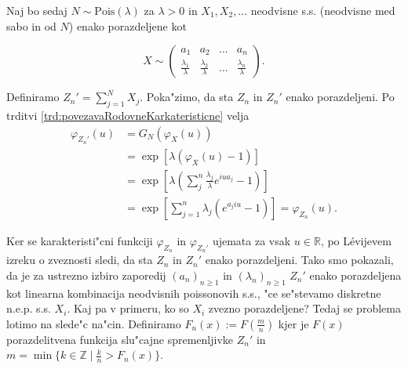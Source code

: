 \documentclass[12pt, a4paper, reqno]{amsart}
\theoremstyle{definition} %
\theoremstyle{plain} %
\newcommand{\R}{\mathbb{R}}
\newcommand{\1}{\mathds{1}}
\newcommand{\Pois}[1]{\text{Pois}(#1)}
\begin{document}
    \noindent
    Naj bo sedaj $N\sim \Pois{\lambda}$  za $\lambda >0$ in $X_1, X_2, \dots$ neodvisne s.s. (neodvisne 
    med sabo in od $N$) enako porazdeljene kot

    $$ X\sim
    \begin{pmatrix}
        a_1 & a_2 &  \dots & a_n \\
        \tfrac{\lambda_1}{\lambda} & \tfrac{\lambda_2}{\lambda} & \dots & \tfrac{\lambda_n}{\lambda}
    \end{pmatrix}.
    $$

    \noindent
    Definiramo $Z_n'=\sum_{j=1}^{N}X_j$. Poka"zimo, da sta $Z_n$ in $Z_n'$ enako porazdeljeni.
    Po trditvi \ref{trd:povezavaRodovneKarkateristicne} velja
    \begin{align*}
        \varphi_{Z_n'}(u) 
                &= G_N\left(\varphi_X(u)\right) \\
                &= \exp\left[\lambda\left(\varphi_X(u) - 1\right)\right] \\
                & = \exp\left[\lambda\left(\sum_j^n\frac{\lambda_j}{\lambda}e^{iua_j} - 1\right)\right]\\
                &= \exp\left[\sum_{j=1}^{n}\lambda_j\left(e^{a_j i u} - 1\right)\right] = \varphi_{Z_n}(u).
    \end{align*}

    \noindent 
    Ker se karakteristi"cni funkciji $\varphi_{Z_n}$ in $\varphi_{Z_n'}$ ujemata za vsak $u\in\R$,
    po Lévijevem izreku o zveznosti sledi, da sta $Z_n$ in $Z_n'$ enako porazdeljeni. Tako smo pokazali, 
    da je za ustrezno izbiro zaporedij $(a_n)_{n\geq1}$ in $(\lambda_n)_{n\geq1}$ $Z_n'$ enako 
    porazdeljena kot linearna kombinacija neodvisnih poissonovih s.s., "ce se"stevamo diskretne 
    n.e.p. s.s. $X_i$. Kaj pa v primeru, ko so $X_i$ zvezno porazdeljene? 
    Tedaj se problema lotimo na slede"c na"cin. Definiramo $F_n(x) := F(\tfrac{m}{n})$ kjer je
    $F(x)$ porazdelitvena funkcija slu"cajne spremenljivke $Z_n'$ in 
    $m = \min\{k \in \mathbb{Z} \mid \tfrac{k}{n} > F_n(x)\}$.

    \begin{center}
    \end{center}
\end{document}
